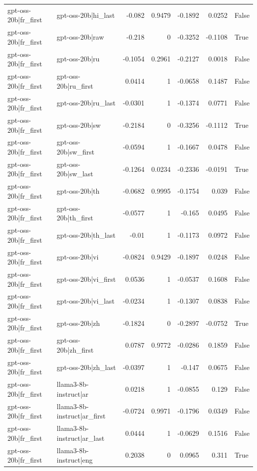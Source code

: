 \begin{table}
\begin{tabular}{l l r r r r l}
gpt-oss-20b|fr_first & gpt-oss-20b|hi_last & -0.082 & 0.9479 & -0.1892 & 0.0252 & False \\
gpt-oss-20b|fr_first & gpt-oss-20b|raw & -0.218 & 0 & -0.3252 & -0.1108 & True \\
gpt-oss-20b|fr_first & gpt-oss-20b|ru & -0.1054 & 0.2961 & -0.2127 & 0.0018 & False \\
gpt-oss-20b|fr_first & gpt-oss-20b|ru_first & 0.0414 & 1 & -0.0658 & 0.1487 & False \\
gpt-oss-20b|fr_first & gpt-oss-20b|ru_last & -0.0301 & 1 & -0.1374 & 0.0771 & False \\
gpt-oss-20b|fr_first & gpt-oss-20b|sw & -0.2184 & 0 & -0.3256 & -0.1112 & True \\
gpt-oss-20b|fr_first & gpt-oss-20b|sw_first & -0.0594 & 1 & -0.1667 & 0.0478 & False \\
gpt-oss-20b|fr_first & gpt-oss-20b|sw_last & -0.1264 & 0.0234 & -0.2336 & -0.0191 & True \\
gpt-oss-20b|fr_first & gpt-oss-20b|th & -0.0682 & 0.9995 & -0.1754 & 0.039 & False \\
gpt-oss-20b|fr_first & gpt-oss-20b|th_first & -0.0577 & 1 & -0.165 & 0.0495 & False \\
gpt-oss-20b|fr_first & gpt-oss-20b|th_last & -0.01 & 1 & -0.1173 & 0.0972 & False \\
gpt-oss-20b|fr_first & gpt-oss-20b|vi & -0.0824 & 0.9429 & -0.1897 & 0.0248 & False \\
gpt-oss-20b|fr_first & gpt-oss-20b|vi_first & 0.0536 & 1 & -0.0537 & 0.1608 & False \\
gpt-oss-20b|fr_first & gpt-oss-20b|vi_last & -0.0234 & 1 & -0.1307 & 0.0838 & False \\
gpt-oss-20b|fr_first & gpt-oss-20b|zh & -0.1824 & 0 & -0.2897 & -0.0752 & True \\
gpt-oss-20b|fr_first & gpt-oss-20b|zh_first & 0.0787 & 0.9772 & -0.0286 & 0.1859 & False \\
gpt-oss-20b|fr_first & gpt-oss-20b|zh_last & -0.0397 & 1 & -0.147 & 0.0675 & False \\
gpt-oss-20b|fr_first & llama3-8b-instruct|ar & 0.0218 & 1 & -0.0855 & 0.129 & False \\
gpt-oss-20b|fr_first & llama3-8b-instruct|ar_first & -0.0724 & 0.9971 & -0.1796 & 0.0349 & False \\
gpt-oss-20b|fr_first & llama3-8b-instruct|ar_last & 0.0444 & 1 & -0.0629 & 0.1516 & False \\
gpt-oss-20b|fr_first & llama3-8b-instruct|eng & 0.2038 & 0 & 0.0965 & 0.311 & True \\

\end{tabular}
\end{table}
